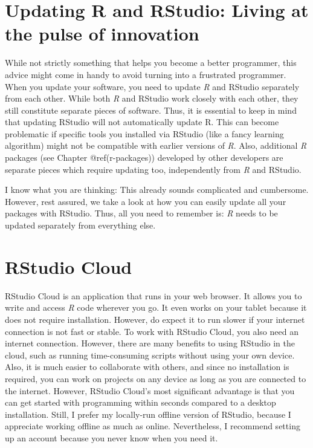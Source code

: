 \documentclass[
  letterpaper,
]{krantz}
\begin{document}
\section{Updating R and RStudio: Living at the pulse of
innovation}\label{sec-updating-r-and-rstudio}

While not strictly something that helps you become a better programmer,
this advice might come in handy to avoid turning into a frustrated
programmer. When you update your software, you need to update \emph{R}
and RStudio separately from each other. While both \emph{R} and RStudio
work closely with each other, they still constitute separate pieces of
software. Thus, it is essential to keep in mind that updating RStudio
will not automatically update R. This can become problematic if specific
tools you installed via RStudio (like a fancy learning algorithm) might
not be compatible with earlier versions of \emph{R}. Also, additional
\emph{R} packages (see Chapter @ref(r-packages)) developed by other
developers are separate pieces which require updating too, independently
from \emph{R} and RStudio.

I know what you are thinking: This already sounds complicated and
cumbersome. However, rest assured, we take a look at how you can easily
update all your packages with RStudio. Thus, all you need to remember
is: \emph{R} needs to be updated separately from everything else.

\section{RStudio Cloud}\label{sec-rstudio-cloud}

RStudio Cloud is an application that runs in your web browser. It allows
you to write and access \emph{R} code wherever you go. It even works on
your tablet because it does not require installation. However, do expect
it to run slower if your internet connection is not fast or stable. To
work with RStudio Cloud, you also need an internet connection. However,
there are many benefits to using RStudio in the cloud, such as running
time-consuming scripts without using your own device. Also, it is much
easier to collaborate with others, and since no installation is
required, you can work on projects on any device as long as you are
connected to the internet. However, RStudio Cloud's most significant
advantage is that you can get started with programming within seconds
compared to a desktop installation. Still, I prefer my locally-run
offline version of RStudio, because I appreciate working offline as much
as online. Nevertheless, I recommend setting up an account because you
never know when you need it.
\end{document}
